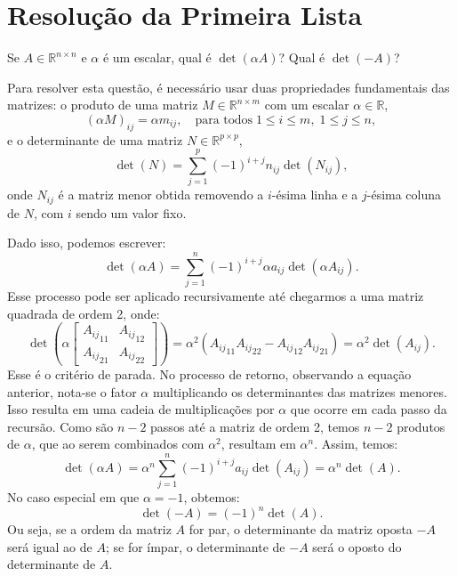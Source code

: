 \chapter{Resolução da Primeira Lista}

\begin{question}
  Se $A \in \mathbb{R}^{n \times n} $ e $\alpha $ é um escalar, qual é $\det(\alpha A) $? Qual é $\det(-A) $?
\end{question}

\begin{resolution}
  Para resolver esta questão, é necessário usar duas propriedades fundamentais das matrizes: o produto de uma matriz $M \in \mathbb{R}^{n \times m}$ com um escalar $\alpha \in \mathbb{R}$,
  \begin{equation}
    (\alpha M)_{ij} = \alpha m_{ij}, \quad \text{para todos} \; 1 \leq i \leq m, \; 1 \leq j \leq n,
  \end{equation}
  e o determinante de uma matriz $N \in \mathbb{R}^{p \times p}$,
  \begin{equation}
    \det(N) = \sum_{j=1}^p (-1)^{i+j} n_{ij} \det(N_{ij}),
  \end{equation}
  onde $N_{ij}$ é a matriz menor obtida removendo a $i$-ésima linha e a $j$-ésima coluna de $N$, com $i$ sendo um valor fixo.

  Dado isso, podemos escrever:
  \begin{equation}
    \det(\alpha A) = \sum_{j=1}^n (-1)^{i+j} \alpha a_{ij} \det(\alpha A_{ij}).
  \end{equation}
  Esse processo pode ser aplicado recursivamente até chegarmos a uma matriz quadrada de ordem 2, onde:
  \begin{equation}
    \det\left(\alpha \begin{bmatrix} {A_{ij}}_{11} & {A_{ij}}_{12} \\ {A_{ij}}_{21} & {A_{ij}}_{22} \end{bmatrix}\right) =
    \alpha^2 \left({A_{ij}}_{11} {A_{ij}}_{22} - {A_{ij}}_{12} {A_{ij}}_{21}\right) = \alpha^2 \det(A_{ij}).
  \end{equation}
  Esse é o critério de parada. No processo de retorno, observando a equação anterior, nota-se o fator $\alpha$ multiplicando os determinantes das matrizes menores. Isso resulta em uma cadeia de multiplicações por $\alpha$ que ocorre em cada passo da recursão. Como são $n-2$ passos até a matriz de ordem 2, temos $n-2$ produtos de $\alpha$, que ao serem combinados com $\alpha^2$, resultam em $\alpha^n$. Assim, temos:
  \begin{equation}
    \det(\alpha A) = \alpha^n \sum_{j=1}^n (-1)^{i+j} a_{ij} \det(A_{ij}) = \alpha^n \det(A).
  \end{equation}
  No caso especial em que $\alpha = -1$, obtemos:
  \begin{equation}
    \det(-A) = (-1)^n \det(A).
  \end{equation}
  Ou seja, se a ordem da matriz $A$ for par, o determinante da matriz oposta $-A$ será igual ao de $A$; se for ímpar, o determinante de $-A$ será o oposto do determinante de $A$.
\end{resolution}


